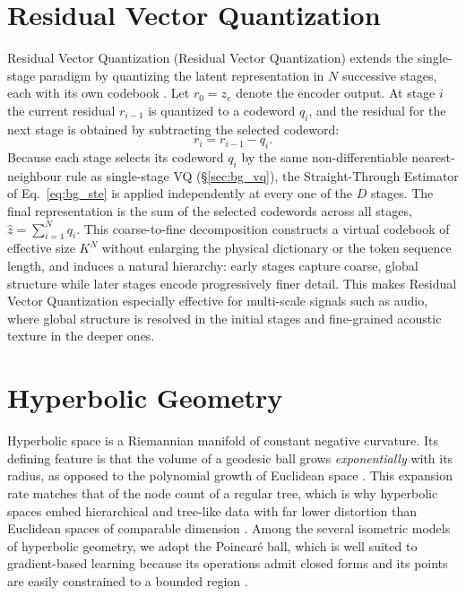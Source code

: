 \documentclass[12pt]{report}
\begin{document}
\section{Residual Vector Quantization}
\label{sec:bg_rvq}
Residual Vector Quantization (Residual Vector Quantization) extends the single-stage paradigm by quantizing the latent representation in $N$ successive stages, each with its own codebook \cite{soundstream}. Let $r_0 = z_e$ denote the encoder output. At stage $i$ the current residual $r_{i-1}$ is quantized to a codeword $q_i$, and the residual for the next stage is obtained by subtracting the selected codeword:
\begin{equation}
    \label{eq:bg_rvq_residual}
    r_i = r_{i-1} - q_i.
\end{equation}
Because each stage selects its codeword $q_i$ by the same non-differentiable nearest-neighbour rule as single-stage VQ (\S\ref{sec:bg_vq}), the Straight-Through Estimator of Eq.~\ref{eq:bg_ste} is applied independently at every one of the $D$ stages. The final representation is the sum of the selected codewords across all stages, $\hat{z} = \sum_{i=1}^{N} q_i$. This coarse-to-fine decomposition constructs a virtual codebook of effective size $K^N$ without enlarging the physical dictionary or the token sequence length, and induces a natural hierarchy: early stages capture coarse, global structure while later stages encode progressively finer detail. This makes Residual Vector Quantization especially effective for multi-scale signals such as audio, where global structure is resolved in the initial stages and fine-grained acoustic texture in the deeper ones. 

\section{Hyperbolic Geometry}
\label{sec:bg_hyperbolic}
Hyperbolic space is a Riemannian manifold of constant negative curvature. Its defining feature is that the volume of a geodesic ball grows \emph{exponentially} with its radius, as opposed to the polynomial growth of Euclidean space \cite{cannon1997hyperbolic}. This expansion rate matches that of the node count of a regular tree, which is why hyperbolic spaces embed hierarchical and tree-like data with far lower distortion than Euclidean spaces of comparable dimension \cite{sala2018representation, nickel2017poincare}. Among the several isometric models of hyperbolic geometry, we adopt the Poincar\'e ball, which is well suited to gradient-based learning because its operations admit closed forms and its points are easily constrained to a bounded region \cite{ganea2018hyperbolic}.
\end{document}
